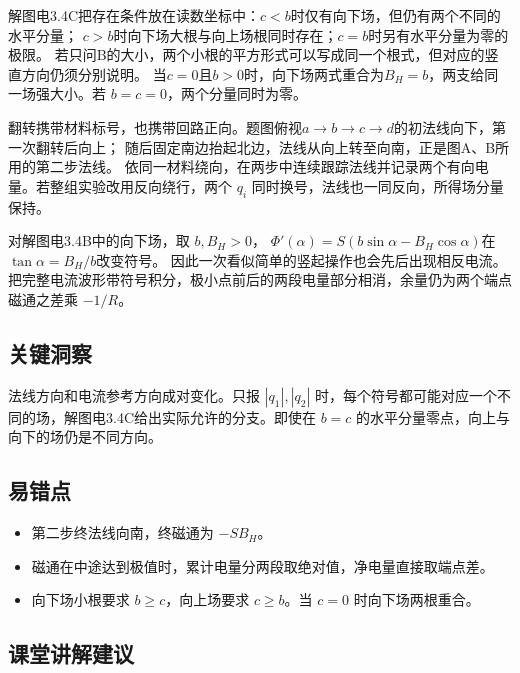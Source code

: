 \documentclass[UTF8,fontset=fandol,a4paper,11pt]{ctexart}
\begin{document}
解图电3.4C把存在条件放在读数坐标中：$c<b$时仅有向下场，但仍有两个不同的水平分量；
$c>b$时向下场大根与向上场根同时存在；$c=b$时另有水平分量为零的极限。
若只问B的大小，两个小根的平方形式可以写成同一个根式，但对应的竖直方向仍须分别说明。
当$c=0$且$b>0$时，向下场两式重合为$B_H=b$，两支给同一场强大小。若 $b=c=0$，两个分量同时为零。

翻转携带材料标号，也携带回路正向。题图俯视$a\to b\to c\to d$的初法线向下，第一次翻转后向上；
随后固定南边抬起北边，法线从向上转至向南，正是图A、B所用的第二步法线。
依同一材料绕向，在两步中连续跟踪法线并记录两个有向电量。若整组实验改用反向绕行，两个 $q_i$ 同时换号，法线也一同反向，所得场分量保持。

对解图电3.4B中的向下场，取 $b,B_H>0$，
$\Phi'(\alpha)=S(b\sin\alpha-B_H\cos\alpha)$在$\tan\alpha=B_H/b$改变符号。
因此一次看似简单的竖起操作也会先后出现相反电流。把完整电流波形带符号积分，极小点前后的两段电量部分相消，余量仍为两个端点磁通之差乘 $-1/R$。




\subsection*{关键洞察}

法线方向和电流参考方向成对变化。只报 $|q_1|,|q_2|$ 时，每个符号都可能对应一个不同的场，解图电3.4C给出实际允许的分支。即使在 $b=c$ 的水平分量零点，向上与向下的场仍是不同方向。



\subsection*{易错点}

\begin{itemize}
\item 第二步终法线向南，终磁通为 $-SB_H$。
\item 磁通在中途达到极值时，累计电量分两段取绝对值，净电量直接取端点差。
\item 向下场小根要求 $b\ge c$，向上场要求 $c\ge b$。当 $c=0$ 时向下场两根重合。
\end{itemize}



\subsection*{课堂讲解建议}
\end{document}

